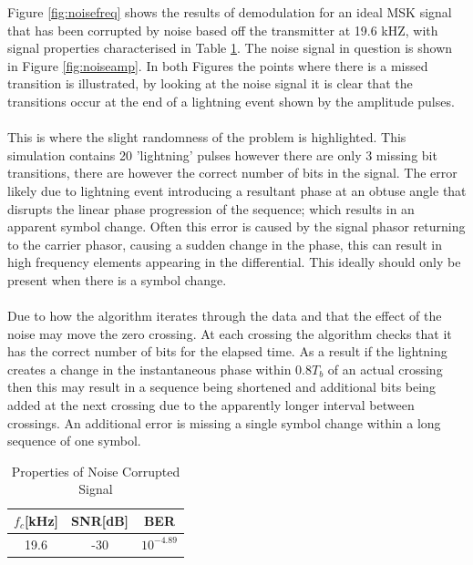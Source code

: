 Figure \ref{fig:noisefreq} shows the results of demodulation for an ideal MSK signal that has been corrupted by noise based off the transmitter at 19.6 kHZ, with signal properties characterised in Table \ref{tab:simProp}. The noise signal in question is shown in Figure \ref{fig:noiseamp}. In both Figures the points where there is a missed transition is illustrated, by looking at the noise signal it is clear that the transitions occur at the end of a lightning event shown by the amplitude pulses. 
\\\\
This is where the slight randomness of the problem is highlighted. This simulation contains 20 'lightning' pulses however there are only 3 missing bit transitions, there are however the correct number of bits in the signal. The error likely due to lightning event introducing a resultant phase at an obtuse angle that disrupts the linear phase progression of the sequence; which results in an apparent symbol change. Often this error is caused by the signal phasor returning to the carrier phasor, causing a sudden change in the phase, this can result in high frequency elements appearing in the differential. This ideally should only be present when there is a symbol change.  
\\\\
Due to how the algorithm iterates through the data and that the effect of the noise may move the zero crossing. At each crossing the algorithm checks that it has the correct number of bits for the elapsed time. As a result if the lightning creates a change in the instantaneous phase within $0.8T_b$ of an actual crossing then this may result in a sequence being shortened and additional bits being added at the next crossing due to the apparently longer interval between crossings. An additional error is missing a single symbol change within a long sequence of one symbol.

\begin{table}[h!]
    \centering
    \begin{tabular}{c|c|c}
        $f_c$[kHz]&SNR[dB] & BER \\
        \hline
        19.6 &-30 & $10^{-4.89}$
    \end{tabular}
    \caption{Properties of Noise Corrupted Signal}
    \label{tab:simProp}
\end{table}

